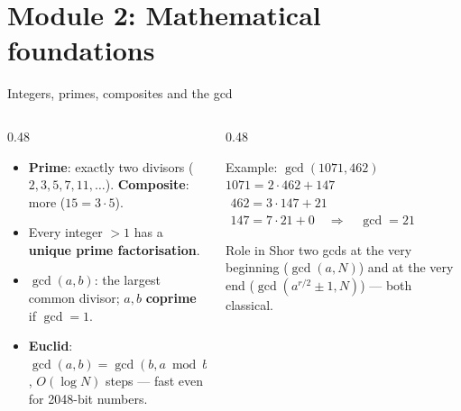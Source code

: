 \documentclass[aspectratio=169,11pt]{beamer}
\newcommand{\key}[1]{{\color{qdark}\textbf{#1}}}
\begin{document}
\section{Module 2: Mathematical foundations}
\begin{frame}[label=fIntegers]{Integers, primes, composites and the gcd}
  \begin{columns}[T]
    \begin{column}{0.48\textwidth}
      \small
      \begin{itemize}\itemsep1pt
        \item \key{Prime}: exactly two divisors ($2, 3, 5, 7, 11, \dots$). \key{Composite}: more ($15 = 3\cdot5$).
        \item Every integer $> 1$ has a \key{unique prime factorisation}.
        \item $\gcd(a, b)$: the largest common divisor; $a, b$ \key{coprime} if $\gcd = 1$.
        \item \key{Euclid}: $\gcd(a, b) = \gcd(b, a \bmod b)$, $O(\log N)$ steps --- fast even for 2048-bit numbers.
      \end{itemize}
    \end{column}
    \begin{column}{0.48\textwidth}
      \begin{exampleblock}{Example: $\gcd(1071, 462)$}
        \small
        $1071 = 2\cdot462 + 147$\\
        $\ \,462 = 3\cdot147 + 21$\\
        $\ \,147 = 7\cdot21 + 0 \quad\Rightarrow\quad \gcd = 21$
      \end{exampleblock}
      \begin{block}{Role in Shor}
        \small two gcds at the very beginning ($\gcd(a, N)$) and at the very end ($\gcd(a^{r/2} \pm 1, N)$) --- both classical.
      \end{block}
    \end{column}
  \end{columns}
\end{frame}
\end{document}
